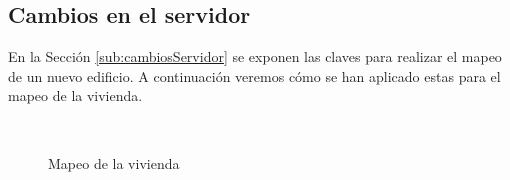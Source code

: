 \subsection{Cambios en el servidor}
\label{sub:cambiosServidor_vivienda}

En la Sección \ref{sub:cambiosServidor} se exponen las claves para realizar el mapeo de un nuevo edificio. A continuación veremos cómo se han aplicado estas para el mapeo de la vivienda.


	
\begin{figure}[t!]
	\centering
	
	
	\\
	
	\caption{Mapeo de la vivienda}
	\label{fig:mapeoCasa}
\end{figure}

